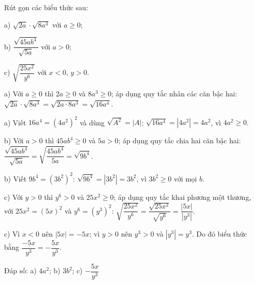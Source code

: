 \begin{problem}[9DS-CAN-013]
Rút gọn các biểu thức sau:

a) $\sqrt{2a} \cdot \sqrt{8a^3}$ với $a \geq 0$;

b) $\dfrac{\sqrt{45ab^4}}{\sqrt{5a}}$ với $a > 0$;

c) $\sqrt{\dfrac{25x^2}{y^6}}$ với $x < 0$, $y > 0$.

\begin{solution}
a) Với $a \geq 0$ thì $2a \geq 0$ và $8a^3 \geq 0$; áp dụng quy tắc nhân các căn bậc hai: $\sqrt{2a} \cdot \sqrt{8a^3} = \sqrt{2a \cdot 8a^3} = \sqrt{16a^4}$.

a) Viết $16a^4 = (4a^2)^2$ và dùng $\sqrt{A^2} = |A|$: $\sqrt{16a^4} = |4a^2| = 4a^2$, vì $4a^2 \geq 0$.

b) Với $a > 0$ thì $45ab^4 \geq 0$ và $5a > 0$; áp dụng quy tắc chia hai căn bậc hai: $\dfrac{\sqrt{45ab^4}}{\sqrt{5a}} = \sqrt{\dfrac{45ab^4}{5a}} = \sqrt{9b^4}$.

b) Viết $9b^4 = (3b^2)^2$: $\sqrt{9b^4} = |3b^2| = 3b^2$, vì $3b^2 \geq 0$ với mọi $b$.

c) Với $y > 0$ thì $y^6 > 0$ và $25x^2 \geq 0$; áp dụng quy tắc khai phương một thương, với $25x^2 = (5x)^2$ và $y^6 = (y^3)^2$: $\sqrt{\dfrac{25x^2}{y^6}} = \dfrac{\sqrt{25x^2}}{\sqrt{y^6}} = \dfrac{|5x|}{|y^3|}$.

c) Vì $x < 0$ nên $|5x| = -5x$; vì $y > 0$ nên $y^3 > 0$ và $|y^3| = y^3$. Do đó biểu thức bằng $\dfrac{-5x}{y^3} = -\dfrac{5x}{y^3}$.

Đáp số: a) $\boxed{4a^2}$; b) $\boxed{3b^2}$; c) $\boxed{-\dfrac{5x}{y^3}}$
\end{solution}
\end{problem}

